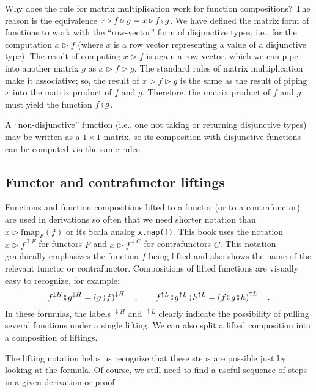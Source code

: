 Why does the rule for matrix multiplication work for function compositions?
The reason is the equivalence $x\triangleright f\triangleright g=x\triangleright f\bef g$.
We have defined the matrix form of functions to work with the \textsf{``}row-vector\textsf{''}
form of disjunctive types, i.e., for the computation $x\triangleright f$
(where $x$ is a row vector representing a value of a disjunctive
type). The result of computing $x\triangleright f$ is again a row
vector, which we can pipe into another matrix $g$ as $x\triangleright f\triangleright g$.
The standard rules of matrix multiplication make it associative; so,
the result of $x\triangleright f\triangleright g$ is the same as
the result of piping $x$ into the matrix product of $f$ and $g$.
Therefore, the matrix product of $f$ and $g$ must yield the function
$f\bef g$.

A \textsf{``}non-disjunctive\textsf{''} function (i.e., one not taking or returning
disjunctive types) may be written as a $1\times1$ matrix, so its
composition with disjunctive functions can be computed via the same
rules. 

\subsection{Functor and contrafunctor liftings}

Functions and function compositions lifted to a functor (or to a contrafunctor)
are used in derivations so often that we need shorter notation than
$x\triangleright\text{fmap}_{F}(f)$ or its Scala analog \lstinline!x.map(f)!.
This book uses the notation $x\triangleright f^{\uparrow F}$ for
functors $F$ and $x\triangleright f^{\downarrow C}$ for contrafunctors
$C$. This notation graphically emphasizes the function $f$ being
lifted and also shows the name of the relevant functor or contrafunctor.
Compositions of lifted functions are visually easy to recognize, for
example:
\[
f^{\downarrow H}\bef g^{\downarrow H}=\left(g\bef f\right)^{\downarrow H}\quad,\quad\quad f^{\uparrow L}\bef g^{\uparrow L}\bef h^{\uparrow L}=\left(f\bef g\bef h\right)^{\uparrow L}\quad.
\]
In these formulas, the labels $^{\downarrow H}$ and $^{\uparrow L}$
clearly indicate the possibility of pulling several functions under
a single lifting. We can also split a lifted composition into a composition
of liftings. 

The lifting notation helps us recognize that these steps are possible
just by looking at the formula. Of course, we still need to find a
useful sequence of steps in a given derivation or proof.

